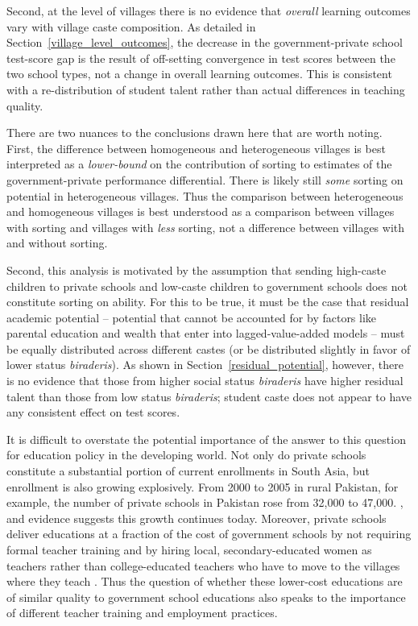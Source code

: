 \documentclass[Eubank_pk_ethnic_sorting.tex]{subfiles}
\begin{document}
Second, at the level of villages there is no evidence that \emph{overall} learning outcomes vary with village caste composition. As detailed in Section~\ref{village_level_outcomes}, the decrease in the government-private school test-score gap is the result of off-setting convergence in test scores between the two school types, not a change in overall learning outcomes. This is consistent with a re-distribution of student talent rather than actual differences in teaching quality. 

There are two nuances to the conclusions drawn here that are worth noting. First, the difference between homogeneous and heterogeneous villages is best interpreted as a \emph{lower-bound} on the contribution of sorting to estimates of the government-private performance differential. There is likely still \emph{some} sorting on potential in heterogeneous villages. Thus the comparison between heterogeneous and homogeneous villages is best understood as a comparison between villages with sorting and villages with \emph{less} sorting, not a difference between villages with and without sorting. 

Second, this analysis is motivated by the assumption that sending high-caste children to private schools and low-caste children to government schools does not constitute sorting on ability. For this to be true, it must be the case that residual academic potential -- potential that cannot be accounted for by factors like parental education and wealth that enter into lagged-value-added models -- must be equally distributed across different castes (or be distributed slightly in favor of lower status \emph{biraderis}). As shown in Section~\ref{residual_potential}, however, there is no evidence that those from higher social status \emph{biraderis} have higher residual talent than those from low status \emph{biraderis}; student caste does not appear to have any consistent effect on test scores. 

It is difficult to overstate the potential importance of the answer to this question for education policy in the developing world. Not only do private schools constitute a substantial portion of current enrollments in South Asia, but enrollment is also growing explosively. From 2000 to 2005 in rural Pakistan, for example, the number of private schools in Pakistan rose from 32,000 to 47,000. \citep[p. vi]{Andrabi:2007we}, and evidence suggests this growth continues today. Moreover, private schools deliver educations at a fraction of the cost of government schools by not requiring formal teacher training and by hiring local, secondary-educated women as teachers rather than college-educated teachers who have to move to the villages where they teach \citep{Andrabi:2007we}. Thus the question of whether these lower-cost educations are of similar quality to government school educations also speaks to the importance of different teacher training and employment practices.
\end{document}
